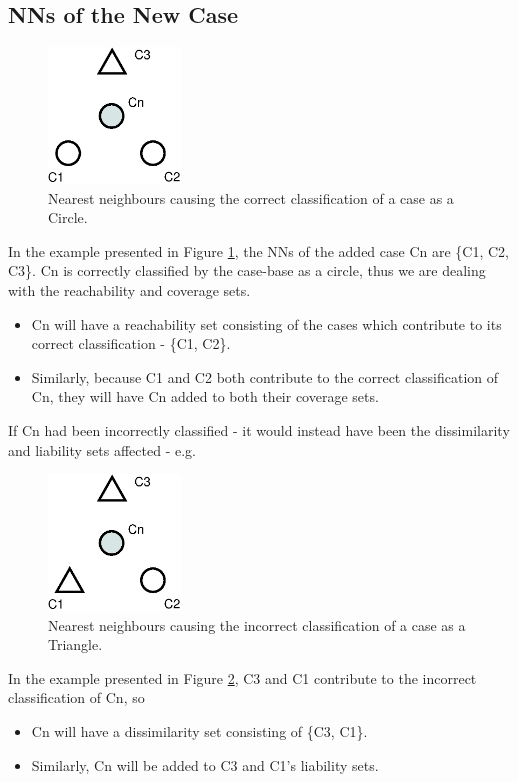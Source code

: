 \documentclass[a4paper,11pt]{report}
\begin{document}
\subsection{NNs of the New Case}
\begin{figure}[h!] 
\centering
	\includegraphics[width=100pt]{./Drawn/NNsCorrectlyClassify}
\caption{Nearest neighbours causing the correct classification of a case as a Circle.}
\label{fig:NNsCorrect}
\end{figure}

In the example presented in Figure \ref{fig:NNsCorrect}, the NNs of the added case Cn are \{C1, C2, C3\}. Cn is correctly classified by the case-base as a circle, thus we are dealing with the reachability and coverage sets.
\begin{itemize}
	\item Cn will have a reachability set consisting of the cases which contribute to its correct classification - \{C1, C2\}.
	\item Similarly, because C1 and C2 both contribute to the correct classification of Cn, they will have Cn added to both their coverage sets.
\end{itemize}

If Cn had been incorrectly classified - it would instead have been the dissimilarity and liability sets affected - e.g.

\begin{figure}[h!]
  \centering
	\includegraphics[width=100pt]{./Drawn/NNsIncorrectlyClassify}
\caption{Nearest neighbours causing the incorrect classification of a case as a Triangle.}
\label{fig:nnsincorrectlyclassify}
\end{figure}

In the example presented in Figure \ref{fig:nnsincorrectlyclassify}, C3 and C1 contribute to the incorrect classification of Cn, so
\begin{itemize}
	\item Cn will have a dissimilarity set consisting of \{C3, C1\}.
	\item Similarly, Cn will be added to C3 and C1's liability sets.
\end{itemize}
\end{document}

